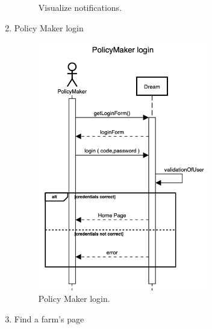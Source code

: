 \begin{enumerate}
\begin{figure}[H]
\begin{center}
        \caption{Visualize notifications.}
        \label{fig:state8}
        \end{center}
    \end{figure}
    \item Policy Maker login
    \begin{figure}[H]
        \begin{center}
        \includegraphics[width=0.7\textwidth]{sequence/PolicyMakerLogin.png}
        \caption{Policy Maker login.}
        \label{fig:state9}
        \end{center}
    \end{figure}
    \item Find a farm's page
    \begin{figure}[H]
        \begin{center}

\end{center}
\end{figure}
\end{enumerate}
